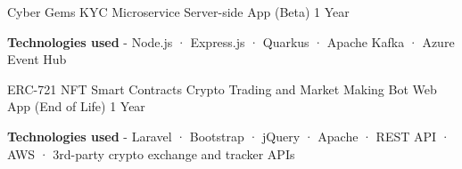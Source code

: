 \begin{cventries}
    {Cyber Gems KYC Microservice} %
    {Server-side App (Beta)} %
    {1 Year} %
    {
      \begin{cvitems} %
        \item {\textbf{Technologies used} \hspace{0.03cm} - \hspace{0.03cm} Node.js \hspace{0.03cm} · \hspace{0.03cm} Express.js \hspace{0.03cm} · \hspace{0.03cm} Quarkus \hspace{0.03cm} · \hspace{0.03cm} Apache Kafka \hspace{0.03cm} · \hspace{0.03cm} Azure Event Hub \\}
      \end{cvitems}
    }
  \cventry
    {ERC-721 NFT Smart Contracts} %
    {Crypto Trading and Market Making Bot} %
    {Web App (End of Life)} %
    {1 Year} %
    {
      \begin{cvitems} %
        \item {\textbf{Technologies used} \hspace{0.03cm} - \hspace{0.03cm} Laravel \hspace{0.03cm} · \hspace{0.03cm} Bootstrap \hspace{0.03cm} · \hspace{0.03cm} jQuery \hspace{0.03cm} · \hspace{0.03cm} Apache \hspace{0.03cm} · \hspace{0.03cm} REST API \hspace{0.03cm} · \hspace{0.03cm} AWS \hspace{0.03cm} · \hspace{0.03cm} 3rd-party crypto exchange and tracker APIs \\}
      \end{cvitems}
    }
\end{cventries}
